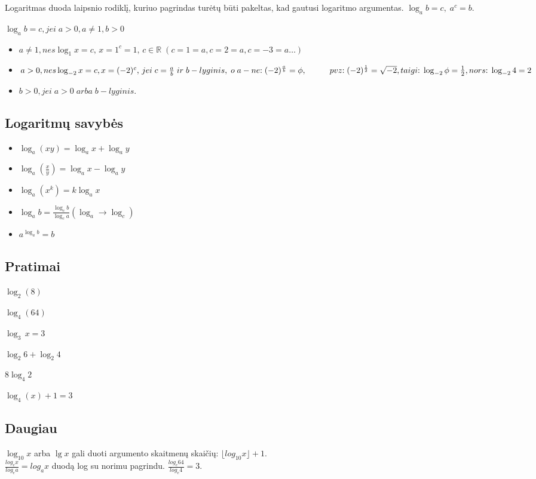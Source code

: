 
Logaritmas duoda laipsnio rodiklį, kuriuo pagrindas turėtų būti pakeltas, kad gautusi logaritmo argumentas.
$\log_a b = c,\;a^c = b$.

\begin{math}
    \log_a b = c, jei\; a > 0, a \ne 1, b > 0
\end{math}

\begin{itemize}
    \item $a \ne 1, nes \log_1 x = c,\,x = 1^c = 1,\, c \in \mathbb{R}\; 
    (c = 1 = a, c = 2 = a, c = -3 = a \dots)$
    \item $a > 0, nes \log_{-2} x = c, x = (-2)^c,\,jei\;c = \frac{a}{b}\;ir\;b - lyginis,\;o\;a - ne{:}\; (-2)^\frac{a}{b} = \phi,\\ \hspace*{10mm} pvz{:}\; (-2)^\frac{1}{2} = \sqrt{-2}, taigi{:}\;\log_{-2} \phi = \frac{1}{2}, nors{:}\; \log_{-2} 4 = 2$
    \item $b > 0, jei\;a > 0\;arba\;b - lyginis.$
\end{itemize}

\subsection{Logaritmų savybės}
\begin{itemize}
    \item $\log_a(xy) = \log_a x + \log_a y$
    \item $\log_a(\frac{x}{y}) = \log_a x - \log_a y$
    \item $\log_a(x^k) = k\log_a x$
    \item $\log_a b = \frac{\log_c b}{\log_c a}$\qquad $(\log_a \rightarrow \log_c)$
    \item $a^{\log_a b} = b$
\end{itemize}

\subsection{Pratimai}

\begin{exercises}
    \item $\log_2(8)            $
    \item $\log_4(64)           $
    \item $\log_3\,x = 3        $
    \item $\log_2 6 + \log_2 4  $
    \item $8\log_4 2           $
    \item $\log_4(x) + 1 = 3    $
\end{exercises} 

\subsection{Daugiau}

$\log_{10} x$ arba $\lg x$ gali duoti argumento skaitmenų skaičių: $\lfloor log_{10} x \rfloor + 1$. \\
$\frac{log_e x}{log_e a} = log_a x$ duodą log su norimu pagrindu. $\frac{log_e 64}{log_e 4} = 3$.

